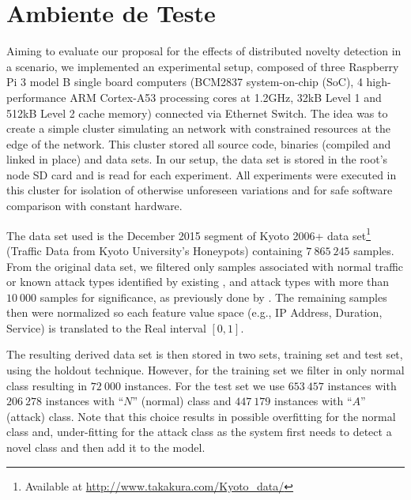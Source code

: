 
\section{Ambiente de Teste}\label{sec:ambiente}

Aiming to evaluate our proposal for the effects of distributed novelty detection
in a \iot \nids scenario, we implemented an experimental setup, composed of
three 
Raspberry Pi 3 model B single board computers 
(BCM2837 system-on-chip (SoC),
4 high-performance ARM Cortex-A53 processing cores at 1.2GHz,
32kB Level 1 and 512kB Level 2 cache memory)
connected via Ethernet
Switch. The idea was to create a simple cluster simulating an \iot network with
constrained resources at the edge of the network.
This cluster stored all source code, binaries (compiled and linked in place) and
data sets.
In our setup, the data set is stored in the root's node SD card and is read for
each experiment.
All experiments were executed in this cluster for isolation of otherwise
unforeseen variations and for safe software comparison with constant hardware.

The data set used is the December 2015 segment of
Kyoto 2006+ data set\footnote{Available at \url{http://www.takakura.com/Kyoto\_data/}}
(Traffic Data from Kyoto University's Honeypots) \cite{Song2011}
containing $7\:865\:245$ samples.
From the original data set, we filtered only samples associated with normal traffic
or known attack types identified by existing \nids, and attack types with more
than $10\:000$ samples for significance, as previously done by
\cite{Cassales2019a}.
The remaining samples then were normalized so each feature value space (e.g., IP
Address, Duration, Service) is translated to the Real interval $[0, 1]$.

The resulting derived data set is then stored in two sets,
training set and test set, using the holdout technique.
However, for the training set we filter in only normal class
resulting in $72\:000$ instances.
For the test set we use $653\:457$ instances with
$206\:278$ instances with ``$N$'' (normal) class and
$447\:179$ instances with ``$A$'' (attack) class.
Note that this choice results in possible overfitting for the normal class and,
under-fitting for the attack class as the system first needs to detect a novel class and
then add it to the model.

